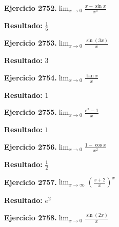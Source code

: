 \documentclass[10pt,a4paper]{article}
\begin{document}
\begin{ejbox}
\textbf{Ejercicio 2752.}\quad $\lim_{x\to 0} \frac{x-\sin x}{x^3}$
\end{ejbox}

\begin{solbox}
\textbf{Resultado:} \(\displaystyle \frac{1}{6}\)
\end{solbox}

\begin{ejbox}
\textbf{Ejercicio 2753.}\quad $\lim_{x\to 0} \frac{\sin(3x)}{x}$
\end{ejbox}

\begin{solbox}
\textbf{Resultado:} \(\displaystyle 3\)
\end{solbox}

\newpage
\begin{ejbox}
\textbf{Ejercicio 2754.}\quad $\lim_{x\to 0} \frac{\tan x}{x}$
\end{ejbox}

\begin{solbox}
\textbf{Resultado:} \(\displaystyle 1\)
\end{solbox}

\begin{ejbox}
\textbf{Ejercicio 2755.}\quad $\lim_{x\to 0} \frac{e^x-1}{x}$
\end{ejbox}

\begin{solbox}
\textbf{Resultado:} \(\displaystyle 1\)
\end{solbox}

\begin{ejbox}
\textbf{Ejercicio 2756.}\quad $\lim_{x\to 0} \frac{1-\cos x}{x^2}$
\end{ejbox}

\begin{solbox}
\textbf{Resultado:} \(\displaystyle \frac{1}{2}\)
\end{solbox}

\newpage
\begin{ejbox}
\textbf{Ejercicio 2757.}\quad $\lim_{x\to \infty} \left(\frac{x+2}{x}\right)^{x}$
\end{ejbox}

\begin{solbox}
\textbf{Resultado:} \(\displaystyle e^{2}\)
\end{solbox}

\begin{ejbox}
\textbf{Ejercicio 2758.}\quad $\lim_{x\to 0} \frac{\sin(2x)}{x}$
\end{ejbox}
\end{document}
